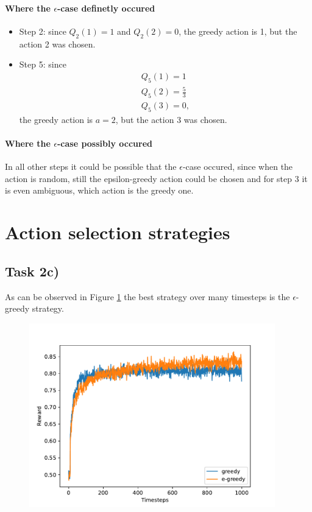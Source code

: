 \documentclass{article}
\begin{document}
\paragraph*{Where the $\epsilon$-case definetly occured}
\begin{itemize}
\item Step 2: since $Q_2(1) = 1$ and $Q_2(2) = 0$, the greedy action is 1, but the action 2 was chosen.
\item Step 5: since 
\begin{align}
Q_5(1) = 1 \\
Q_5(2) = \frac{5}{3} \\
Q_5(3) = 0, 
\end{align}
the greedy action is $a= 2$, but the action 3 was chosen.
\end{itemize}


\paragraph*{Where the $\epsilon$-case possibly occured}
In all other steps it could be possible that the $\epsilon$-case occured, since when the action is random, still the epsilon-greedy action could be chosen and for step 3 it is even ambiguous, which action is the greedy one.

\section{Action selection strategies}

\subsection*{Task 2c)}
As can be observed in Figure \ref{fig:strategies} the best strategy over many timesteps is the $\epsilon$-greedy strategy.

\begin{figure}[H]
\centering
\includegraphics[width=0.95\textwidth]{bandit_strategies.pdf}
\caption{}
\label{fig:strategies}
\end{figure}
\end{document}

